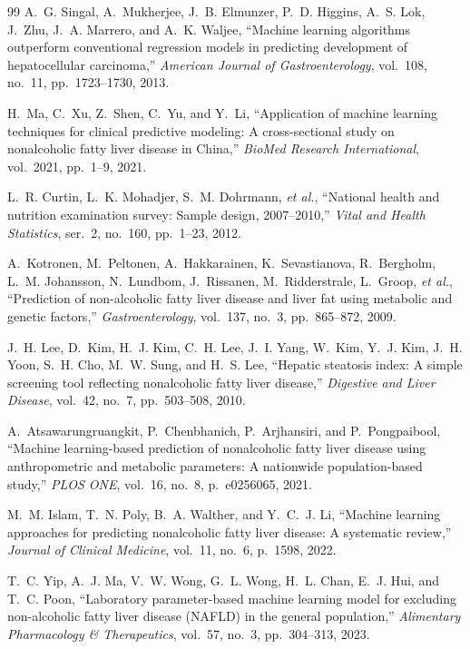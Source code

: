 \documentclass[conference,10pt]{IEEEtran}
\begin{document}
\begin{thebibliography}{99}
A.~G. Singal, A.~Mukherjee, J.~B. Elmunzer, P.~D. Higgins, A.~S. Lok, J.~Zhu, J.~A. Marrero, and A.~K. Waljee,
``Machine learning algorithms outperform conventional regression models in predicting development of hepatocellular carcinoma,''
\textit{American Journal of Gastroenterology}, vol.~108, no.~11, pp.~1723--1730, 2013.

H.~Ma, C.~Xu, Z.~Shen, C.~Yu, and Y.~Li,
``Application of machine learning techniques for clinical predictive modeling: A cross-sectional study on nonalcoholic fatty liver disease in China,''
\textit{BioMed Research International}, vol.~2021, pp.~1--9, 2021.

L.~R. Curtin, L.~K. Mohadjer, S.~M. Dohrmann, \textit{et al.},
``National health and nutrition examination survey: Sample design, 2007--2010,''
\textit{Vital and Health Statistics}, ser.~2, no.~160, pp.~1--23, 2012.

A.~Kotronen, M.~Peltonen, A.~Hakkarainen, K.~Sevastianova, R.~Bergholm, L.~M. Johansson, N.~Lundbom, J.~Rissanen, M.~Ridderstrale, L.~Groop, \textit{et al.},
``Prediction of non-alcoholic fatty liver disease and liver fat using metabolic and genetic factors,''
\textit{Gastroenterology}, vol.~137, no.~3, pp.~865--872, 2009.

J.~H. Lee, D.~Kim, H.~J. Kim, C.~H. Lee, J.~I. Yang, W.~Kim, Y.~J. Kim, J.~H. Yoon, S.~H. Cho, M.~W. Sung, and H.~S. Lee,
``Hepatic steatosis index: A simple screening tool reflecting nonalcoholic fatty liver disease,''
\textit{Digestive and Liver Disease}, vol.~42, no.~7, pp.~503--508, 2010.

A.~Atsawarungruangkit, P.~Chenbhanich, P.~Arjhansiri, and P.~Pongpaibool,
``Machine learning-based prediction of nonalcoholic fatty liver disease using anthropometric and metabolic parameters: A nationwide population-based study,''
\textit{PLOS ONE}, vol.~16, no.~8, p.~e0256065, 2021.

M.~M. Islam, T.~N. Poly, B.~A. Walther, and Y.~C.~J. Li,
``Machine learning approaches for predicting nonalcoholic fatty liver disease: A systematic review,''
\textit{Journal of Clinical Medicine}, vol.~11, no.~6, p.~1598, 2022.

T.~C. Yip, A.~J. Ma, V.~W. Wong, G.~L. Wong, H.~L. Chan, E.~J. Hui, and T.~C. Poon,
``Laboratory parameter-based machine learning model for excluding non-alcoholic fatty liver disease (NAFLD) in the general population,''
\textit{Alimentary Pharmacology \& Therapeutics}, vol.~57, no.~3, pp.~304--313, 2023.


\end{thebibliography}
\end{document}
